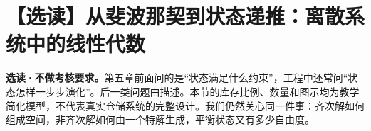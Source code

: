 \documentclass[a4paper,12pt,twoside,openany,fontset=none]{ctexbook}
\numberwithin{equation}{chapter}
\begin{document}
\newcommand{\FiveDynFigure}[4]{%
 \begin{figure}[htbp]\centering
 \renewcommand{\thefigure}{\thesection#1}%
 \renewcommand{\theHfigure}{five.dynamic.\thesection.#1}%
 #4\par\caption{#2}\label{#3}
 \end{figure}\FloatBarrier}
\newcommand{\FiveFieldAxes}{%
 \draw[FiveK!15,step=1] (-2.25,-2.25) grid (2.25,2.25);
 \draw[fiveax] (-2.4,0)--(2.45,0) node[right] {$y_1$};
 \draw[fiveax] (0,-2.4)--(0,2.45) node[above] {$y_2$};}
\newcommand{\FiveFieldNode}{%
 \FiveFieldAxes
 \foreach \xx in {-2,-1,0,1,2}{\foreach \yy in {-2,-1,0,1,2}{
  \draw[FiveB,-{Stealth[length=1.3mm]},line width=.55pt]
   (\xx,\yy)--({.86*\xx},{.72*\yy});}}
 \foreach \sx in {-1,1}{\foreach \sy in {-1,1}{
  \draw[FiveG,line width=.9pt,domain=.07:2,samples=35]
   plot ({\sx*\x},{\sy*.45*\x*\x});
  \draw[FiveG,-{Stealth[length=1.5mm]},domain=1.25:1.1,samples=12]
   plot ({\sx*\x},{\sy*.45*\x*\x});}}
 \fill[FiveR] (0,0) circle(1.8pt);}
\newcommand{\FiveFieldSaddle}{%
 \FiveFieldAxes
 \foreach \xx in {-2,-1,0,1,2}{\foreach \yy in {-2,-1,0,1,2}{
  \draw[FiveB,-{Stealth[length=1.3mm]},line width=.55pt]
   (\xx,\yy)--({1.14*\xx},{.86*\yy});}}
 \foreach \sx in {-1,1}{\foreach \sy in {-1,1}{
  \draw[FiveG,line width=.9pt,domain=.3:2.15,samples=40]
   plot ({\sx*\x},{\sy*.6/\x});
  \draw[FiveG,-{Stealth[length=1.5mm]},domain=.95:1.1,samples=12]
   plot ({\sx*\x},{\sy*.6/\x});}}
 \fill[FiveR] (0,0) circle(1.8pt);}
\newcommand{\FiveFieldCenter}{%
 \FiveFieldAxes
 \foreach \xx in {-2,-1,0,1,2}{\foreach \yy in {-2,-1,0,1,2}{
  \draw[FiveB,-{Stealth[length=1.3mm]},line width=.55pt]
   (\xx,\yy)--({\xx-.14*\yy},{\yy+.14*\xx});}}
 \foreach \rr in {.7,1.35,2}{
  \draw[FiveG,line width=.9pt] (0,0) circle(\rr);
  \draw[FiveG,-{Stealth[length=1.5mm]}]
   (\rr,0) arc[start angle=0,end angle=25,radius=\rr];}
 \fill[FiveR] (0,0) circle(1.8pt);}

\section{【选读】从斐波那契到状态递推：\mbox{离散系统中的线性代数}}
\label{sec:five-discrete}

\textbf{选读·不做考核要求。}第五章前面问的是“状态满足什么约束”，工程中还常问“状态怎样一步步演化”。后一类问题由描述。本节的库存比例、数量和图示均为教学简化模型，不代表真实仓储系统的完整设计。我们仍然关心同一件事：齐次解如何组成空间，非齐次解如何由一个特解生成，平衡状态又有多少自由度。
\end{document}
